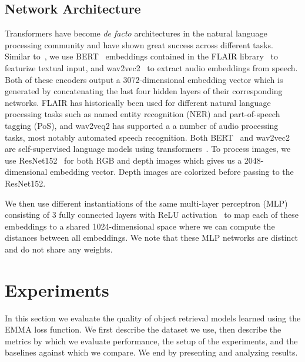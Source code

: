 \documentclass[10pt]{article} %
\begin{document}
\subsection{Network Architecture}
\label{sec:Model}

Transformers have become \textit{de facto} architectures in the natural language processing community and have shown great success across different tasks. Similar to~\citet{GoLD_UMBC}, we use BERT~\citep{devlin-etal-2019-bert} embeddings contained in the FLAIR library~\citep{akbik2019flair,akbik-etal-2019-pooled} to featurize textual input, and wav2vec2~\citep{wav2vec2} to extract audio embeddings from speech. Both of these encoders output a 3072-dimensional embedding vector which is generated by concatenating the last four hidden layers of their corresponding networks.
FLAIR has historically been used for different natural language processing tasks such as named entity recognition (NER) and part-of-speech tagging (PoS), and wav2veq2 has supported a a number of audio processing tasks, most notably automated speech recognition.
Both BERT~\citep{devlin-etal-2019-bert} and wav2vec2~\citep{wav2vec2} are self-supervised language models using transformers~\citep{vaswani2017attention}.
% 
To process images, we use ResNet152~\citep{He_resnet_2016} for both RGB and depth images which gives us a 2048-dimensional embedding vector. Depth images are colorized before passing to the ResNet152.

We then use different instantiations of the same multi-layer perceptron (MLP) consisting of 3 fully connected layers with ReLU activation~\citep{relu2010} to map each of these embeddings to a shared 1024-dimensional space where we can compute the distances between all embeddings. We note that these MLP networks are distinct and do not share any weights.






\section{Experiments}
\label{sec:Experiments}

In this section we evaluate the quality of object retrieval models learned using the EMMA loss function. We first describe the dataset we use, then describe the metrics by which we evaluate performance, the setup of the experiments, and the baselines against which we compare. We end by presenting and analyzing results.
\end{document}
